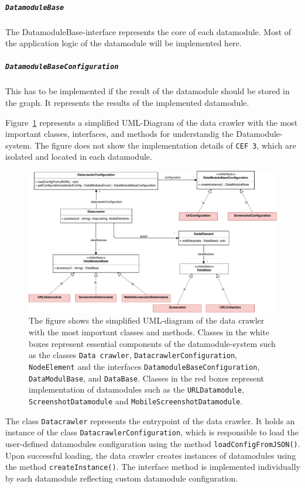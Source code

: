 \subparagraph*{\texttt{DatamoduleBase}}
	The DatamoduleBase-interface represents the core of each datamodule. Most of the application logic of the datamodule will be implemented here.


\subparagraph*{\texttt{DatamoduleBaseConfiguration}}

This has to be implemented if the result of the datamodule should be stored in the graph. It represents the results of the implemented datamodule. 

Figure~\ref{datacrawler_uml_diagram} represents a simplified UML-Diagram of the data crawler with the most important classes, interfaces, and methods for understandig the Datamodule-system. The figure does not show the implementation details of \texttt{CEF 3}, which are isolated and located in each datamodule.

\begin{figure}
	\centering
	\includegraphics[scale=0.44]{resources/datacrawler_uml_diagram}
	\caption[UML-Diagram of the data crawler]{The figure shows the simplified UML-diagram of the data crawler with the most important classes and methods. Classes in the white boxes represent essential components of the datamodule-system such as the classes \texttt{Data crawler}, \texttt{DatacrawlerConfiguration}, \texttt{NodeElement} and the interfaces \texttt{DatamoduleBaseConfiguration}, \texttt{DataModulBase}, and \texttt{DataBase}. Classes in the red boxes represent implementation of datamodules such as the \texttt{URLDatamodule}, \texttt{ScreenshotDatamodule} and \texttt{MobileScreenshotDatamodule}.}
	\label{datacrawler_uml_diagram}
\end{figure}

The class \texttt{Datacrawler} represents the entrypoint of the data crawler. It holds an instance of the class \texttt{DatacrawlerConfiguration}, which is responsible to load the user-defined datamodules configuration using the method \texttt{loadConfigFromJSON()}. Upon successful loading, the data crawler creates instances of datamodules using the method \texttt{createInstance()}. The interface method is implemented individually by each datamodule reflecting custom datamodule configuration. 

